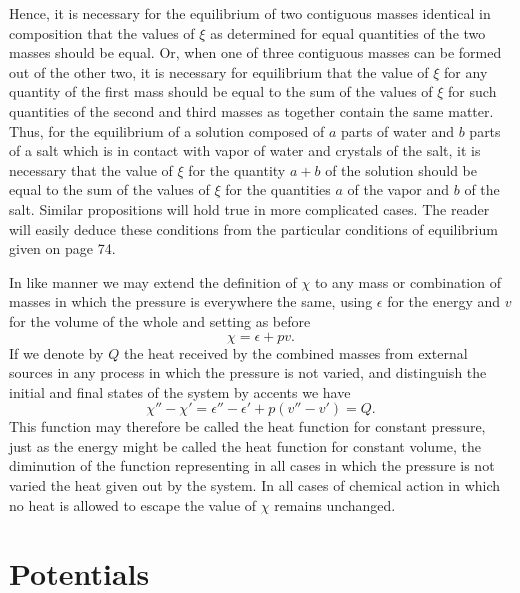 \documentclass[11pt]{article}
\newcommand{\eps}{\epsilon}
\begin{document}
Hence, it is necessary for the equilibrium of two contiguous masses identical in composition that the values of \(\xi\) as determined for equal quantities of the two masses should be equal. Or, when one of three contiguous masses can be formed out of the other two, it is necessary for equilibrium that the value of \(\xi\) for any quantity of the first mass should be equal to the sum of the values of \(\xi\) for such quantities of the second and third masses as together contain the same matter. Thus, for the equilibrium of a solution composed of \(a\) parts of water and \(b\) parts of a salt which is in contact with vapor of water and crystals of the salt, it is necessary that the value of \(\xi\) for the quantity \(a+b\) of the solution should be equal to the sum of the values of \(\xi\) for the quantities \(a\) of the vapor and \(b\) of the salt. Similar propositions will hold true in more complicated cases. The reader will easily deduce these conditions from the particular conditions of equilibrium given on page 74.

In like manner we may extend the definition of \(\chi\) to any mass or combination of masses in which the pressure is everywhere the same, using \(\eps\) for the energy and \(v\) for the volume of the whole and setting as before
\begin{equation}
\chi=\eps+pv.
\end{equation}
If we denote by \(Q\) the heat received by the combined masses from external sources in any process in which the pressure is not varied, and distinguish the initial and final states of the system by accents we have
\begin{equation}
\chi''-\chi'=\eps''-\eps'+p(v''-v')=Q.
\end{equation}
This function may therefore be called the heat function for constant pressure, just as the energy might be called the heat function for constant volume, the diminution of the function representing in all cases in which the pressure is not varied the heat given out by the system. In all cases of chemical action in which no heat is allowed to escape the value of \(\chi\) remains unchanged.

\section*{Potentials}
\end{document}
